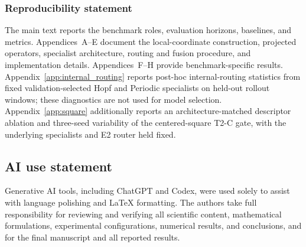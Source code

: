 \documentclass{article}
\begin{document}
\subsubsection*{Reproducibility statement}
The main text reports the benchmark roles, evaluation horizons, baselines, and metrics. Appendices~A--E document the local-coordinate construction, projected operators, specialist architecture, routing and fusion procedure, and implementation details. Appendices~F--H provide benchmark-specific results.
Appendix~\ref{app:internal_routing} reports post-hoc internal-routing statistics
from fixed validation-selected Hopf and Periodic specialists on held-out
rollout windows; these diagnostics are not used for model selection.
Appendix~\ref{app:square} additionally reports an architecture-matched descriptor
ablation and three-seed variability of the centered-square T2-C gate, with the
underlying specialists and E2 router held fixed.

\subsection*{AI use statement}
Generative AI tools, including ChatGPT and Codex, were used solely to assist with language polishing and LaTeX formatting. The authors take full responsibility for reviewing and verifying all scientific
content, mathematical formulations, experimental configurations, numerical
results, and conclusions, and for the final manuscript and all reported results.




\appendix





\FloatBarrier

\FloatBarrier

\FloatBarrier

\clearpage

\end{document}
